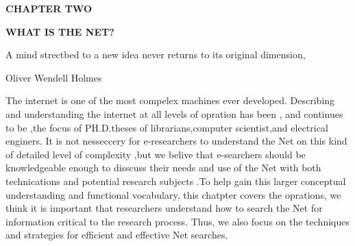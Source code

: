 \documentclass{book} %
\begin{document}


\noindent \begin{flushright}
\textbf{CHAPTER TWO}

\noindent \textbf{                                                                                                                                                     }

\noindent \textbf{WHAT IS THE NET?}

\noindent \textbf{}

\noindent A mind strectbed to a new idea never returns to its original dimension,

\noindent Oliver Wendell Holmes

\noindent 

\noindent 
\end{flushright}

\noindent \begin{flushleft}
The internet is one of the most compelex machines ever developed. Describing and understanding the internet at all levels of opration has been , and continues to be ,the focus of PH.D.theses of librarians,computer scientist,and electrical enginers. It is not nesseccery for e-researchers to understand the Net on this kind of detailed level of complexity ,but we belive that e-searchers should be knowledgeable enough to disscuss their needs and use of the Net with both technications and potential research subjects .To help gain this larger conceptual understanding and functional vocabulary, this chatpter covers the oprations, we think it is important that researchers understand how to search the Net for information critical to the research process. Thus, we also focus on the techniques and strategies for efficient and effective Net searches.
\end{flushleft}

\noindent \begin{flushright}

\end{flushright}
\end{document}
